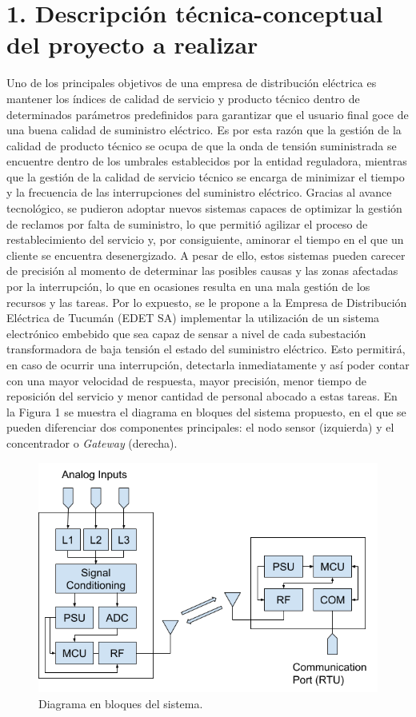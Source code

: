 \documentclass[
11pt, %
]{charter}
\begin{document}
\section{1. Descripción técnica-conceptual del proyecto a realizar}
\label{sec:descripcion}

Uno de los principales objetivos de una empresa de distribución eléctrica es mantener los índices de calidad de servicio y producto técnico dentro de determinados parámetros predefinidos para garantizar que el usuario final goce de una buena calidad de suministro eléctrico. Es por esta razón que la gestión de la calidad de producto técnico se ocupa de que la onda de tensión suministrada se encuentre dentro de los umbrales establecidos por la entidad reguladora, mientras que la gestión de la calidad de servicio técnico se encarga de minimizar el tiempo y la frecuencia de las interrupciones del suministro eléctrico.
Gracias al avance tecnológico, se pudieron adoptar nuevos sistemas capaces de optimizar la gestión de reclamos por falta de suministro, lo que permitió agilizar el proceso de restablecimiento del servicio y, por consiguiente, aminorar el tiempo en el que un cliente se encuentra desenergizado. A pesar de ello, estos sistemas pueden carecer de precisión al momento de determinar las posibles causas y las zonas afectadas por la interrupción, lo que en ocasiones resulta en una mala gestión de los recursos y las tareas. Por lo expuesto, se le propone a la Empresa de Distribución Eléctrica de Tucumán (EDET SA) implementar la utilización de un sistema electrónico embebido que sea capaz de sensar a nivel de cada subestación transformadora de baja tensión el estado del suministro eléctrico. Esto permitirá, en caso de ocurrir una interrupción, detectarla inmediatamente y así poder contar con una mayor velocidad de respuesta, mayor precisión, menor tiempo de reposición del servicio y menor cantidad de personal abocado a estas tareas. En la Figura 1 se muestra el diagrama en bloques del sistema propuesto, en el que se pueden diferenciar dos componentes principales: el nodo sensor (izquierda) y el concentrador o \textit{Gateway} (derecha).

\begin{figure}[htpb]
\centering 
\includegraphics[width=.7\textwidth]{./Figuras/image1.png}
\caption{Diagrama en bloques del sistema.}
\label{fig:diagBloques}
\end{figure}
\end{document}
